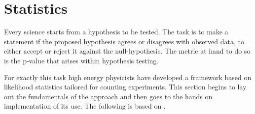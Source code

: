 \section{Statistics}\label{sec:statistics}

Every science starts from a hypothesis to be tested. The task is to make a statement if the proposed hypothesis agrees or disagrees with observed data, to either accept or reject it against the null-hypothesis. The metric at hand to do so is the p-value that arises within hypothesis testing. 

For exactly this task high energy physicists have developed a framework based on likelihood statistics tailored for counting experiments. This section begins to lay out the fundamentals of the approach and then goes to the hands on implementation of its use. The following is based on \citep{cowan2011asymptotic,behnke2013data,pyhf_intro}.

